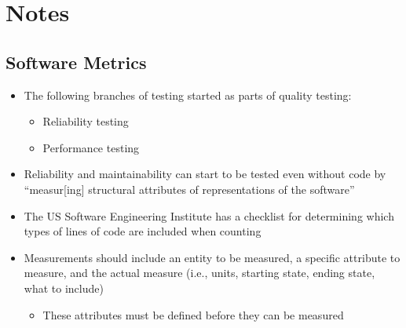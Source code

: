 \chapter{Notes}
\label{chap:notes}

\section{Software Metrics}
\label{chap:notes:sec:software-metrics}

\begin{itemize}
    \item The following branches of testing started as parts of quality
          testing:
          \begin{itemize}
              \item Reliability testing \cite[p.~18, ch.~10]{fenton_software_1997}
              \item Performance testing \cite[p.~18, ch.~7]{fenton_software_1997}
          \end{itemize}
    \item Reliability and maintainability can start to be tested even without
          code by ``measur[ing] structural attributes of representations of the
          software'' \cite[p.~18]{fenton_software_1997}
    \item The US Software Engineering Institute has a checklist for determining
          which types of lines of code are included when counting
          \cite[pp.~30-31]{fenton_software_1997}
    \item Measurements should include an entity to be measured, a specific
          attribute to measure, and the actual measure (i.e., units, starting
          state, ending state, what to include) \cite[p.~36]{fenton_software_1997}
          \begin{itemize}
              \item These attributes must be defined before they can be
                    measured \cite[p.~38]{fenton_software_1997}
          \end{itemize}
\end{itemize}
